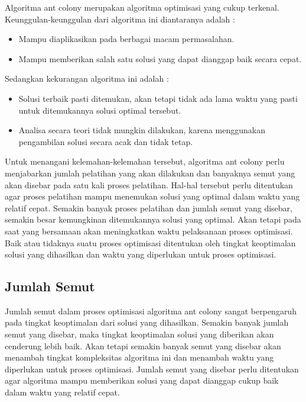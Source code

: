 	Algoritma ant colony merupakan algoritma optimisasi yang cukup terkenal. Keunggulan-keunggulan
	dari algoritma ini diantaranya adalah :
	\begin{itemize}
		\item Mampu diaplikasikan pada berbagai macam permasalahan.
		\item Mampu memberikan salah satu solusi yang dapat dianggap baik secara cepat.
	\end{itemize}

	Sedangkan kekurangan algoritma ini adalah :
	\begin{itemize}
		\item Solusi terbaik pasti ditemukan, akan tetapi tidak ada lama waktu yang pasti untuk ditemukannya
		solusi optimal tersebut.
		\item Analisa secara teori tidak mungkin dilakukan, karena menggunakan pengambilan solusi secara
		acak dan tidak tetap.
	\end{itemize}

	Untuk menangani kelemahan-kelemahan tersebut, algoritma ant colony perlu menjabarkan jumlah
	pelatihan yang akan dilakukan dan banyaknya semut yang akan disebar pada satu kali proses
	pelatihan. Hal-hal tersebut perlu ditentukan agar proses pelatihan mampu menemukan solusi yang
	optimal dalam waktu yang relatif cepat. Semakin banyak proses pelatihan dan jumlah semut yang
	disebar, semakin besar kemungkinan ditemukannya solusi yang optimal. Akan tetapi pada saat
	yang bersamaan akan meningkatkan waktu pelaksanaan proses optimisasi. Baik atau tidaknya suatu
	proses optimisasi ditentukan oleh tingkat keoptimalan solusi yang dihasilkan dan waktu yang
	diperlukan untuk proses optimisasi.
	
	\subsection{Jumlah Semut}
	
	Jumlah semut dalam proses optimisasi algoritma ant colony sangat berpengaruh pada tingkat keoptimalan
	dari solusi yang dihasilkan. Semakin banyak jumlah semut yang disebar, maka tingkat
	keoptimalan solusi yang diberikan akan cenderung lebih baik. Akan tetapi semakin banyak semut
	yang disebar akan menambah tingkat kompleksitas algoritma ini dan menambah waktu yang diperlukan
	untuk proses optimisasi. Jumlah semut yang disebar perlu ditentukan agar algoritma mampu
	memberikan solusi yang dapat dianggap cukup baik dalam waktu yang relatif cepat.
	
